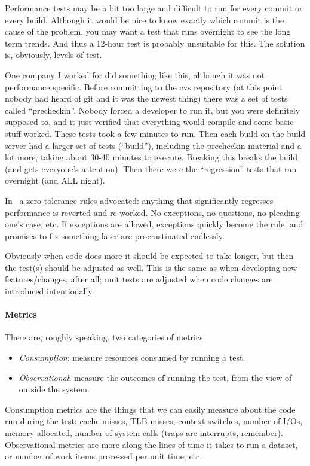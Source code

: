 \documentclass[a4paper]{report}
\begin{document}
Performance tests may be a bit too large and difficult to run for every commit or every build. Although it would be nice to know exactly which commit is the cause of the problem, you may want a test that runs overnight to see the long term trends. And thus a 12-hour test is probably unsuitable for this. The solution is, obviously, levels of test. 

One company I worked for did something like this, although it was not performance specific. Before committing to the cvs repository (at this point nobody had heard of git  and it was the newest thing) there was a set of tests called ``precheckin''. Nobody forced a developer to run it, but you were definitely supposed to, and it just verified that everything would compile and some basic stuff worked. These tests took a few minutes to run. Then each build on the build server had a larger set of tests (``build''), including the precheckin material and a lot more, taking about 30-40 minutes to execute. Breaking this breaks the build (and gets everyone's attention). Then there were the ``regression'' tests that ran overnight (and ALL night).

In~\cite{perfculture} a zero tolerance rules advocated: anything that significantly regresses performance is reverted and re-worked. No exceptions, no questions, no pleading one's case, etc. If exceptions are allowed, exceptions quickly become the rule, and promises to fix something later are procrastinated endlessly.

Obviously when code does more it should be expected to take longer, but then the test(s) should be adjusted as well. This is the same as when developing new features/changes, after all; unit tests are adjusted when code changes are introduced intentionally.

\paragraph{Metrics} There are, roughly speaking, two categories of metrics:

\begin{itemize}
	\item \textit{Consumption}: measure resources consumed by running a test.
	\item \textit{Observational}: measure the outcomes of running the test, from the view of outside the system.
\end{itemize}

Consumption metrics are the things that we can easily measure about the code run during the test: cache misses, TLB misses, context switches, number of I/Os, memory allocated, number of system calls (traps are interrupts, remember). Observational metrics are more along the lines of time it takes to run a dataset, or number of work items processed per unit time, etc.
\end{document}
